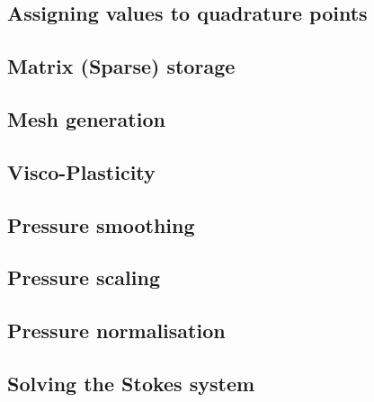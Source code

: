 \documentclass[a4paper]{article}
\begin{document}
\subsection{Assigning values to quadrature points}  %
\newpage %
\subsection{Matrix (Sparse) storage}  %
\newpage %
\subsection{Mesh generation} \label{sec:meshes}  %
\newpage %
\subsection{Visco-Plasticity}  %
\newpage %
\subsection{Pressure smoothing \label{psmoothing}}  %
\newpage %
\subsection{Pressure scaling}  %
\newpage %
\subsection{Pressure normalisation\label{ss_pnorm}}  %
\newpage %
\subsection{Solving the Stokes system \label{sec:solvers}}  %
\newpage %
\end{document}
